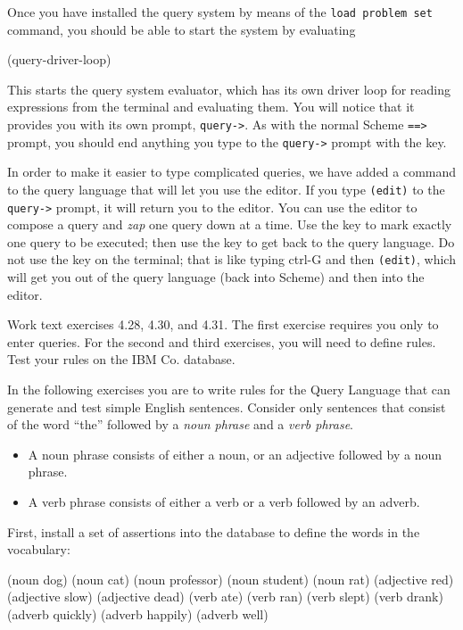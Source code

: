Once you have installed the query system by means of the {\tt load problem set}
command, you should be able to start the system by evaluating

\beginlisp
(query-driver-loop)
\endlisp

This starts the query system evaluator, which has its own driver loop for 
reading expressions from the terminal and evaluating them.  You will notice
that it provides you with its own prompt, {\tt query->}.  As with the normal
Scheme {\tt ==>} prompt, you should end anything you type to the {\tt query->}
prompt with the  key.

In order to make it easier to type complicated queries, we have added
a command to the query language that will let you use the editor.  If
you type {\tt (edit)} to the {\tt query->} prompt, it will return you
to the editor. You can use the editor to compose a query and {\em zap}
one query down at a time.  Use the  key to mark
exactly one query to be executed; then use the  key to
get back to the query language.  Do not use the  key on the
terminal; that is like typing ctrl-G and then {\tt (edit)}, which will
get you out of the query language (back into Scheme) and then into the
editor.

\exercise Work text exercises 4.28, 4.30, and 4.31.  The first exercise
requires you only to enter queries.  For the second and third exercises,
you will need to define rules.  Test your rules on the IBM Co. database.

\medskip

In the following exercises you are to write rules for the Query Language
that can generate and test simple English sentences.  Consider only 
sentences that consist of the word ``the'' followed by a {\em noun phrase}
and a {\em verb phrase}.

\begin{itemize}

\item A noun phrase consists of either a noun, or an adjective followed by 
a noun phrase.

\item A verb phrase consists of either a verb or a verb followed by an adverb.

\end{itemize}

First, install a set of assertions into the database to define the words in the
vocabulary:

\beginsmalllisp
(noun dog)
(noun cat)
(noun professor)
(noun student)
(noun rat)
(adjective red)
(adjective slow)
(adjective dead)
(verb ate)
(verb ran)
(verb slept)
(verb drank)
(adverb quickly)
(adverb happily)
(adverb well)
\endsmalllisp

